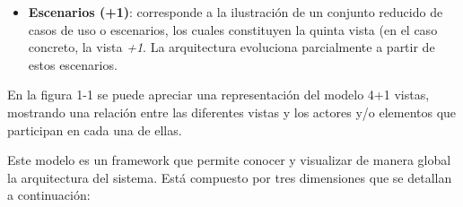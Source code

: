\documentclass{memoria}
\begin{document}
\begin{itemize}
\item \textbf{Escenarios (+1)}: corresponde a la ilustración de un conjunto reducido de casos de uso o escenarios, los cuales constituyen la quinta vista (en el caso concreto, la vista \textsl{+1}. La arquitectura evoluciona parcialmente a partir de estos escenarios.
\end{itemize}


En la figura 1-1 se puede apreciar una representación del modelo 4+1 vistas, mostrando una relación entre las diferentes vistas y los actores y/o elementos que participan en cada una de ellas.


Este modelo es un framework que permite conocer y visualizar de manera global la arquitectura del sistema. Está compuesto por tres dimensiones que se detallan a continuación:
\end{document}
